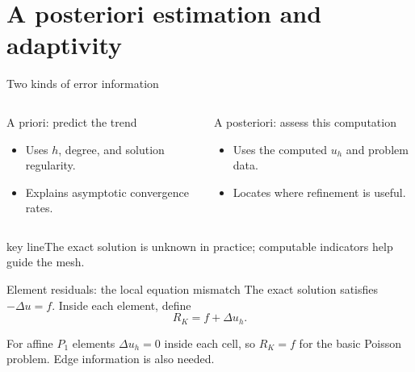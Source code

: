 \documentclass[aspectratio=169,11pt]{beamer}
\newcommand{\key}[1]{\par\vspace{4mm}\begin{beamercolorbox}[sep=2.5mm,wd=\textwidth]{key line}\normalsize #1\end{beamercolorbox}}
\begin{document}
\section{A posteriori estimation and adaptivity}
\begin{frame}{Two kinds of error information}
\begin{columns}[c,onlytextwidth]
\begin{block}{A priori: predict the trend}
\begin{itemize}
\item Uses $h$, degree, and solution regularity.
\item Explains asymptotic convergence rates.
\end{itemize}
\end{block}
\begin{exampleblock}{A posteriori: assess this computation}
\begin{itemize}
\item Uses the computed $u_h$ and problem data.
\item Locates where refinement is useful.
\end{itemize}
\end{exampleblock}
\end{columns}\key{The exact solution is unknown in practice; computable indicators help guide the mesh.}
\end{frame}

\begin{frame}{Element residuals: the local equation mismatch}
The exact solution satisfies $-\Delta u=f$. Inside each element, define\[
\boxed{R_K=f+\Delta u_h.}
\]\begin{exampleblock}{For affine $P_1$ elements}
$\Delta u_h=0$ inside each cell, so $R_K=f$ for the basic Poisson problem. Edge information is also needed.
\end{exampleblock}
\end{frame}
\end{document}
